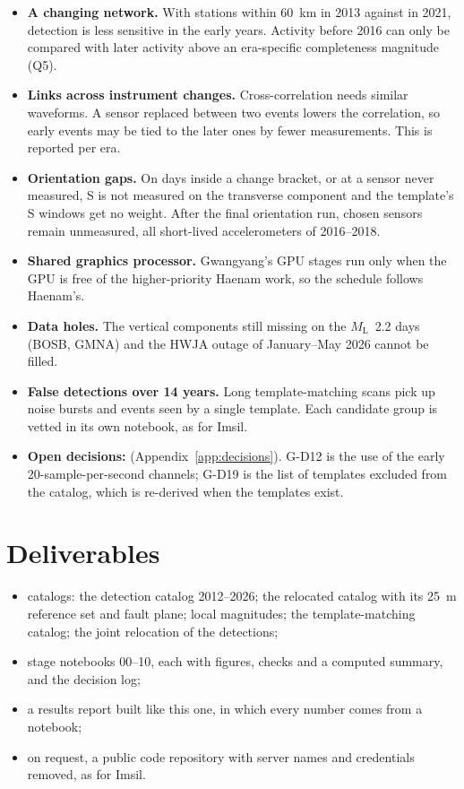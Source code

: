 \documentclass[11pt,a4paper]{article}
\newcommand{\ML}{\ensuremath{M_\mathrm{L}}}
\begin{document}
\begin{itemize}
\item \textbf{A changing network.} With  stations within 60~km in 2013 against  in 2021, detection is less sensitive in the early years. Activity before 2016 can only be compared with later activity above an era-specific completeness magnitude (Q5).
\item \textbf{Links across instrument changes.} Cross-correlation needs similar waveforms. A sensor replaced between two events lowers the correlation, so early events may be tied to the later ones by fewer measurements. This is reported per era.
\item \textbf{Orientation gaps.} On days inside a change bracket, or at a sensor never measured, S is not measured on the transverse component and the template's S windows get no weight. After the final orientation run,  chosen sensors remain unmeasured, all short-lived accelerometers of 2016--2018.
\item \textbf{Shared graphics processor.} Gwangyang's GPU stages run only when the GPU is free of the higher-priority Haenam work, so the schedule follows Haenam's.
\item \textbf{Data holes.} The vertical components still missing on the \ML\ 2.2 days (BOSB, GMNA) and the HWJA outage of January--May 2026 cannot be filled.
\item \textbf{False detections over 14 years.} Long template-matching scans pick up noise bursts and events seen by a single template. Each candidate group is vetted in its own notebook, as for Imsil.
\item \textbf{Open decisions:}  (Appendix~\ref{app:decisions}). G-D12 is the use of the early 20-sample-per-second channels; G-D19 is the list of templates excluded from the catalog, which is re-derived when the templates exist.
\end{itemize}

\section{Deliverables}

\begin{itemize}
\item catalogs: the detection catalog 2012--2026; the relocated catalog with its 25~m reference set and fault plane; local magnitudes; the template-matching catalog; the joint relocation of the detections;
\item stage notebooks 00--10, each with figures, checks and a computed summary, and the decision log;
\item a results report built like this one, in which every number comes from a notebook;
\item on request, a public code repository with server names and credentials removed, as for Imsil.
\end{itemize}
\end{document}
